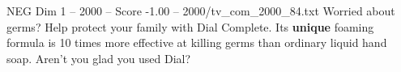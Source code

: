 \begin{textsample}{NEG Dim 1 – 2000 – Score -1.00 – 2000/tv\_com\_2000\_84.txt}  \label{ex:f1_neg_024}
Worried about germs?
Help protect your family with Dial Complete.
Its \textbf{unique} foaming formula is 10 times more effective at killing germs than ordinary liquid hand soap.
Aren't you glad you used Dial?

\end{textsample}
